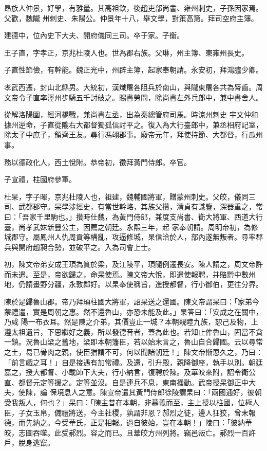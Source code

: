 \begin{pinyinscope}
 昂族人仲景，好學，有雅量。其高祖欽，後趙吏部尚書、雍州刺史，子孫因家焉。父歡，魏隴
 州刺史、朱陽公。仲景年十八，舉文學，對策高第。拜司空府主簿。



 建德中，位內史下大夫、開府儀同三司。卒于家。子衡。



 王子直，字孝正，京兆杜陵人也。世為郡右族。父琳，州主簿、東雍州長史。



 子直性節儉，有幹能。魏正光中，州辟主簿，起家奉朝請。永安初，拜鴻臚少卿。



 孝武西遷，封山北縣男。大統初，漢熾屠各阻兵於南山，與隴東屠各共為脣齒。周文帝令子直率涇州步騎五千討破之。賜書勞問，除尚書左外兵郎中，兼中書舍人。



 從解洛陽圍，經河橋戰，兼尚書左丞，出為秦總管府司馬。時涼州刺史
 宇文仲和據州逆命，子直從隴右大都督獨孤信討平之。復入為大行臺郎中，兼丞相府記室，除太子中庶子，領齊王友。尋行馮翊郡事。廢帝元年，拜使持節、大都督，行瓜州事。



 務以德政化人，西土悅附。恭帝初，徵拜黃門侍郎。卒官。



 子宣禮，柱國府參軍。



 杜杲，字子暉，京兆杜陵人也，祖建，魏輔國將軍，贈蒙州刺史。父皎，儀同三司、武都郡守。杲學涉經史，有當世幹略，其族父攢，清貞有識鑒，深器重之，常曰：「吾家千里駒也。」攢時仕魏，為黃門侍郎，兼度支尚書、衛大將軍、西道大行臺，尚孝武妹新豐公主，因薦之朝廷。永熙三年，起
 家奉朝請。周明帝初，為修城郡守。屬鳳州人仇周貢等構亂，攻逼修城，杲信洽於人，部內遂無叛者。尋率郡兵與開府趙昶合勢，並破平之。入為司會上士。



 初，陳文帝弟安成王頊為質於梁，及江陵平，頊隨例遷長安。陳人請之，周文帝許而未遣。至是，帝欲歸之，命杲使焉。陳文帝大悅，即遣使報聘，并賂黔中數州地，仍請畫野分疆，永敦鄰好。以杲奉使稱旨，進授都督，行小御伯，更往分界。



 陳於是歸魯山郡。帝乃拜頊柱國大將軍，詔杲送之還國。陳文帝謂杲曰：「家弟今蒙禮遣，實是周朝之惠。然不還魯山，亦恐未能及此。」杲答曰：「安成之在關中，乃咸
 陽一布衣耳。然是陳之介弟，其價豈止一城？本朝親睦九族，恕己及物，上遵太祖遺旨，下思繼好之義，所以發德音者，蓋為此也。若知止侔魯山，固當不貪一鎮。況魯山梁之舊地，梁即本朝籓臣，若以始末言之，魯山自合歸國。云以尋常之土，易已骨肉之親，使臣猶謂不可，何以聞諸朝廷！」陳文帝慚恧久之，乃曰：「前言戲之耳！」自是接遇有加常禮。及還，引升殿，親降御座，執手以別。朝廷嘉之，授大都督、小載師下大夫，行小納言，復聘於陳。及華皎來附，詔令衛公直、都督元定等援之。定等並沒。自是連兵不息，東南搔動。武帝授杲御正中大夫，使陳，論
 保境息人之意。陳宣帝遣其黃門侍郎徐陵謂杲曰：「兩國通好，彼朝受我叛人，何也？」杲曰：「陳主昔在本朝，非慕義而至，主上授以柱國，位極人臣，子女玉帛，備禮將送，今主社稷，孰謂非恩？郝烈之徒，邊人狂狡，曾未報德，而先納之。今受華氏，正是相報。過自彼始，豈在本朝！」陵曰：「彼納華皎，志圖吞噬。此受郝烈。容之而已。且華皎方州列將。竊邑叛亡。郝烈一百許戶，脫身逃竄。




\end{pinyinscope}
